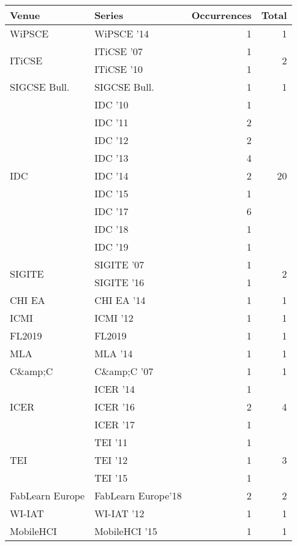 \begin{table*}[t]
\begin{tabular}{llrr}
Venue & Series & Occurrences & Total\\\hline
\multirow{1}{*}{WiPSCE } & WiPSCE '14 & 1 & \multirow{1}{*}{1}\\
\multirow{2}{*}{ITiCSE } & ITiCSE '07 & 1 & \multirow{2}{*}{2}\\
& ITiCSE '10 & 1 &\\
\multirow{1}{*}{SIGCSE Bull.} & SIGCSE Bull. & 1 & \multirow{1}{*}{1}\\
\multirow{9}{*}{IDC } & IDC '10 & 1 & \multirow{9}{*}{20}\\
& IDC '11 & 2 &\\
& IDC '12 & 2 &\\
& IDC '13 & 4 &\\
& IDC '14 & 2 &\\
& IDC '15 & 1 &\\
& IDC '17 & 6 &\\
& IDC '18 & 1 &\\
& IDC '19 & 1 &\\
\multirow{2}{*}{SIGITE } & SIGITE '07 & 1 & \multirow{2}{*}{2}\\
& SIGITE '16 & 1 &\\
\multirow{1}{*}{CHI EA } & CHI EA '14 & 1 & \multirow{1}{*}{1}\\
\multirow{1}{*}{ICMI } & ICMI '12 & 1 & \multirow{1}{*}{1}\\
\multirow{1}{*}{FL2019} & FL2019 & 1 & \multirow{1}{*}{1}\\
\multirow{1}{*}{MLA } & MLA '14 & 1 & \multirow{1}{*}{1}\\
\multirow{1}{*}{C\&amp;C } & C\&amp;C '07 & 1 & \multirow{1}{*}{1}\\
\multirow{3}{*}{ICER } & ICER '14 & 1 & \multirow{3}{*}{4}\\
& ICER '16 & 2 &\\
& ICER '17 & 1 &\\
\multirow{3}{*}{TEI } & TEI '11 & 1 & \multirow{3}{*}{3}\\
& TEI '12 & 1 &\\
& TEI '15 & 1 &\\
\multirow{1}{*}{FabLearn Europe} & FabLearn Europe'18 & 2 & \multirow{1}{*}{2}\\
\multirow{1}{*}{WI-IAT } & WI-IAT '12 & 1 & \multirow{1}{*}{1}\\
\multirow{1}{*}{MobileHCI } & MobileHCI '15 & 1 & \multirow{1}{*}{1}\\

\end{tabular}
\end{table*}
